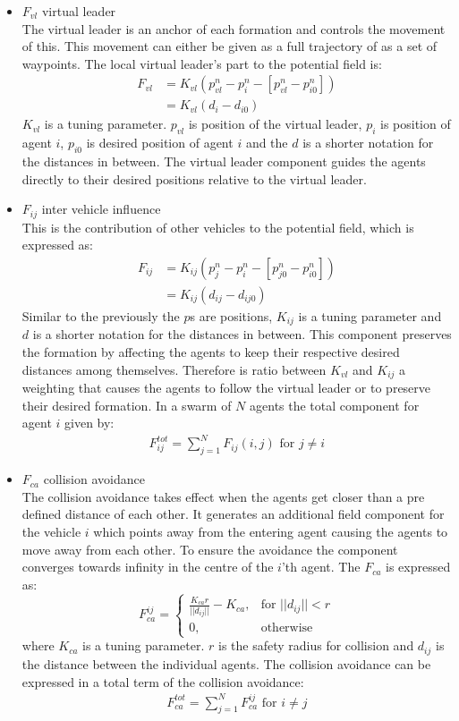\begin{itemize}
\item $F_{vl}$ virtual leader\\
The virtual leader is an anchor of each formation and controls the movement of this. This movement can either be given as a full trajectory of as a set of waypoints. The local virtual leader's part to the potential field is:
\begin{align}
F_{vl} &= K_{vl}(p_{vl}^n-p_i^n-[p_{vl}^n-p_{i0}^n])\\
&= K_{vl}(d_i-d_{i0})
\end{align}
$K_{vl}$ is a tuning parameter. $p_{vl}$ is position of the virtual leader, $p_i$ is position of agent $i$, $p_{i0}$ is desired position of agent $i$ and the $d$ is a shorter notation for the distances in between. The virtual leader component guides the agents directly to their desired positions relative to the virtual leader.

\item $F_{ij}$ inter vehicle influence\\
This is the contribution of other vehicles to the potential field, which is expressed as:
\begin{align}
F_{ij} &= K_{ij}(p_{j}^n-p_i^n-[p_{j0}^n-p_{i0}^n])\\
&= K_{ij}(d_{ij}-d_{ij0})
\end{align}
Similar to the previously the $p$s are positions, $K_{ij}$ is a tuning parameter and $d$ is a shorter notation for the distances in between. This component preserves the formation by affecting the agents to keep their respective desired distances among themselves. Therefore is ratio between $K_{vl}$ and $K_{ij}$ a weighting that causes the agents to follow the virtual leader or to preserve their desired formation. In a swarm of $N$ agents the total component for agent $i$ given by:
\begin{align}
F_{ij}^{tot} = \sum\limits_{j=1}^NF_{ij}(i,j) \text{ for } j\neq i
\end{align}

\item $F_{ca}$ collision avoidance\\
The collision avoidance takes effect when the agents get closer than a pre defined distance of each other. It generates an additional field component for the vehicle $i$ which points away from the entering agent causing the agents to move away from each other. To ensure the avoidance the component converges towards infinity in the centre of the $i$'th agent. The $F_{ca}$ is expressed as:
\[
    F_{ca}^{ij}= 
\begin{cases}
    \frac{K_{ca}r}{||d_{ij}||}-K_{ca},& \text{for } ||d_{ij}||<r\\
    0,              & \text{otherwise}
\end{cases}
\]
where $K_{ca}$ is a tuning parameter. $r$ is the safety radius for collision and $d_{ij}$ is the distance between the individual agents.
The collision avoidance can be expressed in a total term of the collision avoidance:
\begin{align}
F_{ca}^{tot} = \sum\limits_{j=1}^NF_{ca}^{ij} \text{ for } i\neq j
\end{align}


\end{itemize}
